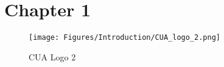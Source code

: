 \chapter{Chapter 1}\label{appendix: chapter1}

\begin{figure}
\centering
         \texttt{[image: Figures/Introduction/CUA\_logo\_2.png]}
         \caption{CUA Logo 2}
         \label{CUA-logo-2}
\end{figure}